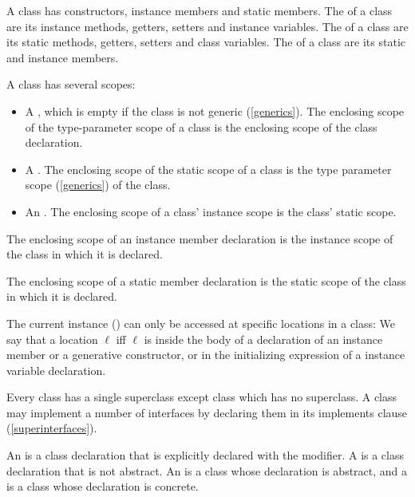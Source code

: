 \documentclass[makeidx]{article}
\begin{document}
\LMHash{}%
A class has constructors, instance members and static members.
The  of a class
are its instance methods, getters, setters and instance variables.
The  of a class
are its static methods, getters, setters and class variables.
The  of a class
are its static and instance members.

\LMHash{}%
A class has several scopes:
\begin{itemize}
\item A ,
  which is empty if the class is not generic (\ref{generics}).
The enclosing scope of the type-parameter scope of a class is the enclosing scope of the class declaration.
\item A .
The enclosing scope of the static scope of a class is the type parameter scope (\ref{generics}) of the class.
\item An .
The enclosing scope of a class' instance scope is the class' static scope.
\end{itemize}

\LMHash{}%
The enclosing scope of an instance member declaration is the instance scope of the class in which it is declared.

\LMHash{}%
The enclosing scope of a static member declaration is the static scope of the class in which it is declared.

\LMHash{}%
The current instance
()
can only be accessed at specific locations in a class:
We say that a location $\ell$
if{}f $\ell$ is inside the body of a declaration of
an instance member or a generative constructor,
or in the initializing expression of a \LATE{} instance variable declaration.


\LMHash{}%
Every class has a single superclass except class  which has no superclass.
A class may implement a number of interfaces by declaring them in its implements clause (\ref{superinterfaces}).

\LMHash{}%
An 
is a class declaration that is explicitly declared
with the \ABSTRACT{} modifier.
A 
is a class declaration that is not abstract.
An  is a class
whose declaration is abstract, and
a  is a class
whose declaration is concrete.
\end{document}

